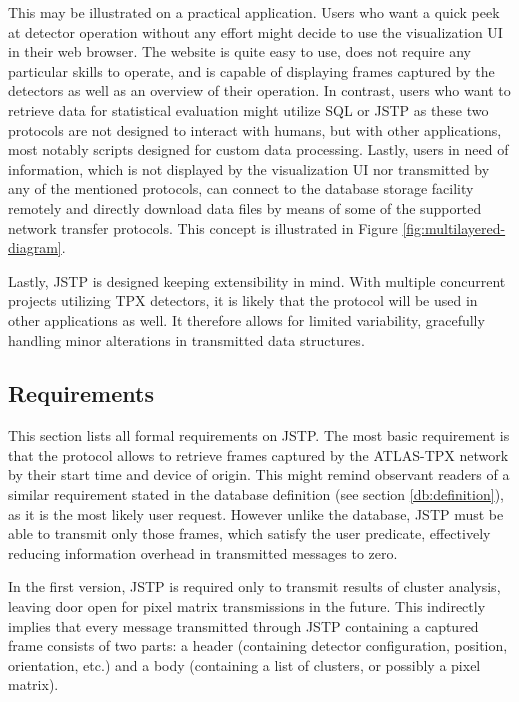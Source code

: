 This may be illustrated on a practical application. Users who want a quick peek at detector operation without any effort might decide to use the visualization UI in their web browser. The website is quite easy to use, does not require any particular skills to operate, and is capable of displaying frames captured by the detectors as well as an overview of their operation. In contrast, users who want to retrieve data for statistical evaluation might utilize SQL or JSTP as these two protocols are not designed to interact with humans, but with other applications, most notably scripts designed for custom data processing. Lastly, users in need of information, which is not displayed by the visualization UI nor transmitted by any of the mentioned protocols, can connect to the database storage facility remotely and directly download data files by means of some of the supported network transfer protocols. This concept is illustrated in Figure \ref{fig:multilayered-diagram}.

Lastly, JSTP is designed keeping extensibility in mind. With multiple concurrent projects utilizing TPX detectors, it is likely that the protocol will be used in other applications as well. It therefore allows for limited variability, gracefully handling minor alterations in transmitted data structures.
\todo %

\todo %

\subsection{Requirements}
This section lists all formal requirements on JSTP. The most basic requirement is that the protocol allows to retrieve frames captured by the ATLAS-TPX network by their start time and device of origin. This might remind observant readers of a similar requirement stated in the database definition (see section \ref{db:definition}), as it is the most likely user request. However unlike the database, JSTP must be able to transmit only those frames, which satisfy the user predicate, effectively reducing information overhead in transmitted messages to zero.

In the first version, JSTP is required only to transmit results of cluster analysis, leaving door open for pixel matrix transmissions in the future. This indirectly implies that every message transmitted through JSTP containing a captured frame consists of two parts: a header (containing detector configuration, position, orientation, etc.) and a body (containing a list of clusters, or possibly a pixel matrix).

